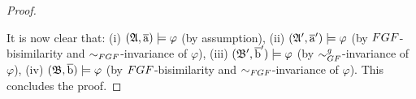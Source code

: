 \begin{proof}
\begin{figure}[H]
  \label{fig:fgf-to-gf-upgrade}
\end{figure}

It is now clear that: 
(i) $({\mathfrak{A}}, \overline{\mathrm{a}}) \models \varphi$ (by assumption),
(ii) $({\mathfrak{A}}', \overline{\mathrm{a}}') \models \varphi$ (by $\FGF$-bisimilarity and $\bisimto_{\FGF}$-invariance of $\varphi$),
(iii) $({\mathfrak{B}}', \overline{\mathrm{b}}') \models \varphi$ (by $\bisimto_{\GF}^{\mathit{g}}$-invariance of $\varphi$),
(iv) $({\mathfrak{B}}, \overline{\mathrm{b}}) \models \varphi$ (by $\FGF$-bisimilarity and $\bisimto_{\FGF}$-invariance of $\varphi$).
This concludes the proof.
\end{proof}




